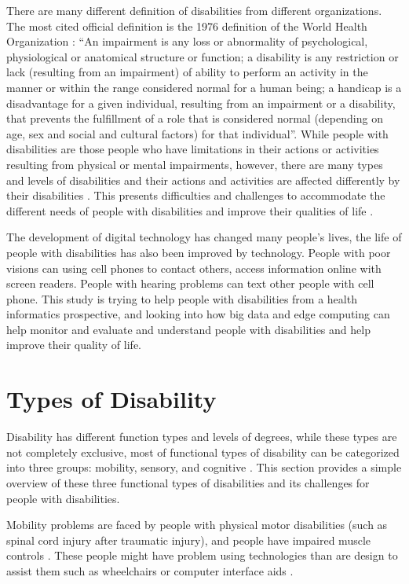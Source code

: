 \documentclass[sigconf]{acmart}
\begin{document}
There are many different definition of disabilities from different organizations. The most cited official definition is the 1976 definition of the World Health Organization \cite{Appleyard2005}: ``An impairment is any loss or abnormality of psychological, physiological or anatomical structure or function; a disability is any restriction or lack (resulting from an impairment) of ability to perform an activity in the manner or within the range considered normal for a human being; a handicap is a disadvantage for a given individual, resulting from an impairment or a disability, that prevents the fulfillment of a role that is considered normal (depending on age, sex and social and cultural factors) for that individual''. While people with disabilities are those people who have limitations in their actions or activities resulting from physical or mental impairments, however, there are many types and levels of disabilities and their actions and activities are affected differently by their disabilities \cite{Appleyard2005}. This presents difficulties and challenges to accommodate the different needs of people with disabilities and improve their qualities of life \cite{Datapop}. 

The development of digital technology has changed many people's lives, the life of people with disabilities has also been improved by technology. People with poor visions can using cell phones to contact others, access information online with screen readers. People with hearing problems can text other people with cell phone. This study is trying to help people with disabilities from a health informatics prospective, and looking into how big data and edge computing can help monitor and evaluate and understand people with disabilities and help improve their quality of life. 

\section{Types of Disability}
Disability has different function types and levels of degrees, while these types are not completely exclusive, most of functional types of disability can be categorized into three groups: mobility, sensory, and cognitive \cite{Appleyard2005}. This section provides a simple overview of these three functional types of disabilities and its challenges for people with disabilities. 

Mobility problems are faced by people with physical motor disabilities (such as spinal cord injury after traumatic injury), and people have impaired muscle controls \cite{SMITH1987376}. These people might have problem using technologies than are design to assist them such as wheelchairs or computer interface aids \cite{Appleyard2005}.
\end{document}
